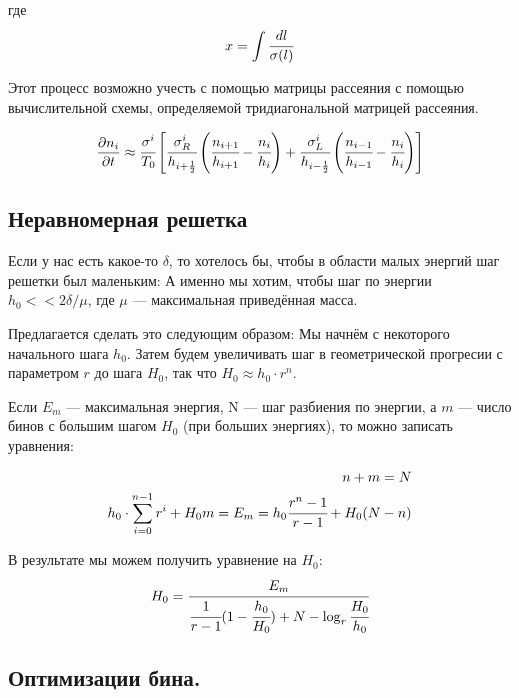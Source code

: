 где 
\begin{equation*}
	x = \int{\cfrac{dl}{\sigma(l)}}
\end{equation*}

Этот процесс возможно учесть с помощью матрицы рассеяния с помощью вычислительной схемы, определяемой тридиагональной матрицей рассеяния.

\begin{equation*}
	\frac{\partial n_i}{\partial t} \approx  \cfrac{\sigma^i}{T_0} 
	\left[\cfrac{\sigma^i_R}{h_{i+\frac{1}{2}}} 
		\left(\cfrac{n_{i+1}}{h_{i+1}}-\cfrac{n_{i}}{h_{i}}\right) +
		\cfrac{\sigma^i_L}{h_{i-\frac{1}{2}}}
		\left(\cfrac{n_{i-1}}{h_{i-1}}-\cfrac{n_{i}}{h_{i}}\right) 
	\right]
\end{equation*}

\subsection{Неравномерная решетка}
Если у нас есть какое-то $\delta$, то хотелось бы, чтобы в области малых энергий шаг решетки был маленьким: А именно мы хотим, чтобы шаг по энергии $h_0 << 2\delta/\mu$, где $\mu$ --- максимальная приведённая масса. 

Предлагается сделать это следующим образом:
Мы начнём с некоторого начального шага $h_0$. Затем будем увеличивать шаг в геометрической прогресии с параметром $r$ до шага $H_0$, так что $H_0 \approx h_0\cdot r^n$.

Если $E_{m}$ --- максимальная энергия, N --- шаг разбиения по энергии, а $m$ --- число бинов с большим шагом $H_0$ (при больших энергиях), то можно записать уравнения:

\begin{eqnarray*}
	n+m = N \\
	h_0 \cdot \sum_{i=0}^{n-1}{r^i} + H_0 m = E_{m} = h_0 \cfrac{r^n-1}{r-1} + H_0 (N-n)
\end{eqnarray*}

В результате мы можем получить уравнение на $H_0$:
\begin{equation*}
	H_0 = \cfrac{E_m}{ \cfrac{1}{r-1} (1-\cfrac{h_0}{H_0}) + N - \log_{r}{\cfrac{H_0}{h_0}}}
\end{equation*}

\subsection{Оптимизации бина.}



